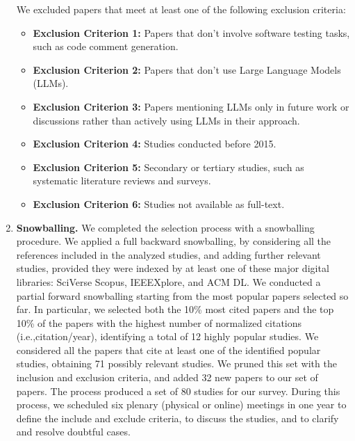 \begin{enumerate}[label=\textbf{\arabic*.}]
\begin{itemize}
      \end{itemize}

  We excluded papers that meet at least one of the following exclusion criteria:
        \begin{itemize}
            \item \textbf{Exclusion Criterion 1:} Papers that don't involve software testing tasks, such as code comment generation.
            \item \textbf{Exclusion Criterion 2:} Papers that don't use Large Language Models (LLMs).
            \item \textbf{Exclusion Criterion 3:} Papers mentioning LLMs only in future work or discussions rather than actively using LLMs in their approach.
            \item \textbf{Exclusion Criterion 4:} Studies conducted before 2015.
            \item \textbf{Exclusion Criterion 5:} Secondary or tertiary studies, such as systematic literature reviews and surveys.
            \item \textbf{Exclusion Criterion 6:} Studies not available as full-text.
      \end{itemize}
      
  \item\textbf{Snowballing.} We completed the selection process with a snowballing procedure. We applied a full backward snowballing, by considering all the references included in the analyzed studies, and adding further relevant studies, provided they were indexed by at least one of these major digital libraries: SciVerse Scopus, IEEEXplore, and ACM DL. We conducted a partial forward snowballing starting from the most popular papers selected so far. In particular, we selected both the 10\% most cited papers and the top 10\% of the papers with the highest number of normalized citations (i.e.,citation/year), identifying a total of 12 highly popular studies. We considered all the papers that cite at least one of the identified popular studies, obtaining 71 possibly relevant studies. We pruned this set with the inclusion and exclusion criteria, and added 32 new papers to our set of papers. The process produced a set of 80 studies for our survey. During this process, we scheduled six plenary (physical or online) meetings in one year to define the include and exclude criteria, to discuss the studies, and to clarify and resolve doubtful cases.
\end{enumerate}

